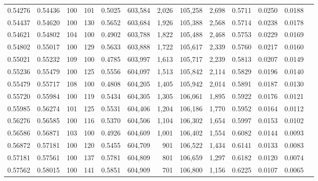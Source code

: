\begin{tabular}{rrrrrrrrrrrrr}
0.54276 & 0.54436 &   100 & 101 &                                     0.5025 & 603,584 &   2,026 & 105,258 &   2,698 & 0.5711 & 0.0250 & 0.0188 \\
0.54437 & 0.54620 &   100 & 130 &                                     0.5652 & 603,684 &   1,926 & 105,388 &   2,568 & 0.5714 & 0.0238 & 0.0178 \\
0.54621 & 0.54802 &   104 & 100 &                                     0.4902 & 603,788 &   1,822 & 105,488 &   2,468 & 0.5753 & 0.0229 & 0.0169 \\
0.54802 & 0.55017 &   100 & 129 &                                     0.5633 & 603,888 &   1,722 & 105,617 &   2,339 & 0.5760 & 0.0217 & 0.0160 \\
0.55021 & 0.55232 &   109 & 100 &                                     0.4785 & 603,997 &   1,613 & 105,717 &   2,239 & 0.5813 & 0.0207 & 0.0149 \\
0.55236 & 0.55479 &   100 & 125 &                                     0.5556 & 604,097 &   1,513 & 105,842 &   2,114 & 0.5829 & 0.0196 & 0.0140 \\
0.55479 & 0.55717 &   108 & 100 &                                     0.4808 & 604,205 &   1,405 & 105,942 &   2,014 & 0.5891 & 0.0187 & 0.0130 \\
0.55720 & 0.55984 &   100 & 119 &                                     0.5434 & 604,305 &   1,305 & 106,061 &   1,895 & 0.5922 & 0.0176 & 0.0121 \\
0.55985 & 0.56274 &   101 & 125 &                                     0.5531 & 604,406 &   1,204 & 106,186 &   1,770 & 0.5952 & 0.0164 & 0.0112 \\
0.56276 & 0.56585 &   100 & 116 &                                     0.5370 & 604,506 &   1,104 & 106,302 &   1,654 & 0.5997 & 0.0153 & 0.0102 \\
0.56586 & 0.56871 &   103 & 100 &                                     0.4926 & 604,609 &   1,001 & 106,402 &   1,554 & 0.6082 & 0.0144 & 0.0093 \\
0.56872 & 0.57181 &   100 & 120 &                                     0.5455 & 604,709 &     901 & 106,522 &   1,434 & 0.6141 & 0.0133 & 0.0083 \\
0.57181 & 0.57561 &   100 & 137 &                                     0.5781 & 604,809 &     801 & 106,659 &   1,297 & 0.6182 & 0.0120 & 0.0074 \\
0.57562 & 0.58015 &   100 & 141 &                                     0.5851 & 604,909 &     701 & 106,800 &   1,156 & 0.6225 & 0.0107 & 0.0065 \\

\end{tabular}
